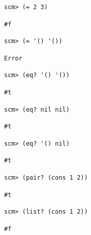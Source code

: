 \documentclass{exam}
\begin{document}
\begin{questions}
\begin{blocksection}
\begin{lstlisting}
scm> (= 2 3)
\end{lstlisting}
\begin{solution}[.25in]
\begin{lstlisting}
#f
\end{lstlisting}
\end{solution}

\begin{lstlisting}
scm> (= '() '())
\end{lstlisting}
\begin{solution}[.25in]
\begin{lstlisting}
Error
\end{lstlisting}
\end{solution}

\begin{lstlisting}
scm> (eq? '() '())
\end{lstlisting}
\begin{solution}[.25in]
\begin{lstlisting}
#t
\end{lstlisting}
\end{solution}

\begin{lstlisting}
scm> (eq? nil nil)
\end{lstlisting}
\begin{solution}[.25in]
\begin{lstlisting}
#t
\end{lstlisting}
\end{solution}

\begin{lstlisting}
scm> (eq? '() nil)
\end{lstlisting}
\begin{solution}[.25in]
\begin{lstlisting}
#t
\end{lstlisting}
\end{solution}

\begin{lstlisting}
scm> (pair? (cons 1 2))
\end{lstlisting}
\begin{solution}[.25in]
\begin{lstlisting}
#t
\end{lstlisting}
\end{solution}

\begin{lstlisting}
scm> (list? (cons 1 2))
\end{lstlisting}
\begin{solution}[.25in]
\begin{lstlisting}
#f
\end{lstlisting}
\end{solution}
\end{blocksection}


\end{questions}
\end{document}
